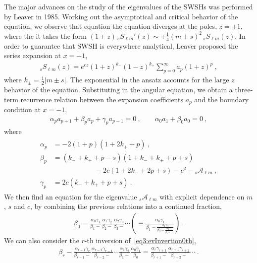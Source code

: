 The major advances on the study of the eigenvalues of the SWSHs was performed by Leaver in 1985. Working out the asymptotical and critical behavior of the equation, we observe that equation the equation diverges at the poles, $z = \pm 1$, where the it takes the form $(1 \mp z) \,{}_{s}S_{\ell m}{}'(z) \sim \mp \tfrac{1}{4} (m \pm s)^2 \, {}_{s}S_{\ell m}(z)$. In order to guarantee that SWSH is everywhere analytical, Leaver proposed the series expansion at $x=-1$,
\begin{align}
    {}_{s}S_{\ell m}(z) = e^{c z} (1+z)^{k_-} (1-z)^{k_+} \sum_{p=0}^\infty a_p (1+z)^p ~,
\end{align}
where $k_{\pm} = \tfrac{1}{2}|m \pm s|$.
The exponential in the ansatz accounts for the large $z$ behavior of the equation.
Substituting in the angular equation, we obtain a three-term recurrence relation between the expansion coefficients $a_p$ and the boundary condition at $x=-1$,
\begin{align}
    \label{eq3:ap3CoefRecursion}
    \alpha_p a_{p+1} + \beta_p a_p + \gamma_p a_{p-1} = 0 ~,\qquad
    \alpha_0 a_1 + \beta_0 a_0 = 0 ~,
\end{align}
where
\begin{align}
    \begin{split}
        \alpha_p &= -2 (1 + p) (1 + 2 k_{+} + p) ~,\\
        \beta_p  &= (k_{-} + k_{+} + p - s) (1 + k_{-} + k_{+} + p + s) \\
        &\qquad\qquad\qquad - 2 c (1 + 2 k_{-} + 2 p + s) - c^2 - {}_{s}\mathscr{A}_{\ell m} ~,\\
        \gamma_p &= 2 c (k_{-} + k_{+} + p + s) ~.
    \end{split}
\end{align}
We then find an equation for the eigenvalue ${}_{s}\mathscr{A}_{\ell m}$ with explicit dependence on $m$, $s$ and $c$, by combining the previous relations into a continued fraction,
\begin{align}
    \beta_0 = \frac{\alpha_0 \gamma_1}{\beta_1 -} \frac{\alpha_1 \gamma_2}{\beta_2 -} \frac{\alpha_2 \gamma_3}{\beta_3 -} \cdots \left( \equiv  \frac{\alpha_0 \gamma_1}{\beta_1 - \frac{\alpha_1 \gamma_2}{\beta_2 - \frac{\alpha_2 \gamma_3}{\beta_3 - \dots}}} \right)  ~.
    \label{eq3:evInvertion0th}
\end{align}
We can also consider the $r$-th inversion of~\eqref{eq3:evInvertion0th},
\begin{align}
    \beta_r - \frac{\alpha_{r-1} \gamma_r}{\beta_{r-1} -} \frac{\alpha_{r-2} \gamma_{r-1}}{\beta_{r-2} -} \cdots \frac{\alpha_{1} \gamma_2}{\beta_{1} -} \frac{\alpha_{0} \gamma_{1}}{\beta_{0}} = \frac{\alpha_{r} \gamma_{r+1}}{\beta_{r+1} -} \frac{\alpha_{r+1} \gamma_{r+2}}{\beta_{r+2} -} \cdots ~.
    \label{eq3:evInvertionRth}
\end{align}
